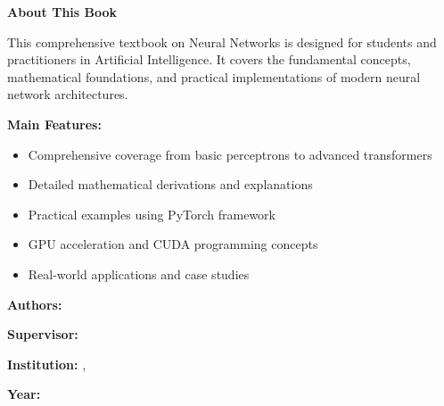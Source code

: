 % 
%
%

\newpage
\thispagestyle{empty}

\vspace*{2cm}

\begin{center}
    \Large\textbf{About This Book}
\end{center}

\vspace{1cm}

This comprehensive textbook on Neural Networks is designed for students and practitioners in Artificial Intelligence. It covers the fundamental concepts, mathematical foundations, and practical implementations of modern neural network architectures.

\textbf{Main Features:}
\begin{itemize}
    \item Comprehensive coverage from basic perceptrons to advanced transformers
    \item Detailed mathematical derivations and explanations
    \item Practical examples using PyTorch framework
    \item GPU acceleration and CUDA programming concepts
    \item Real-world applications and case studies
\end{itemize}

\vspace{2cm}

\textbf{Authors:} \thesisAuthor

\textbf{Supervisor:} \thesisTutor

\textbf{Institution:} \thesisSchool, \thesisDepartment

\textbf{Year:} \thesisYear

\newpage
